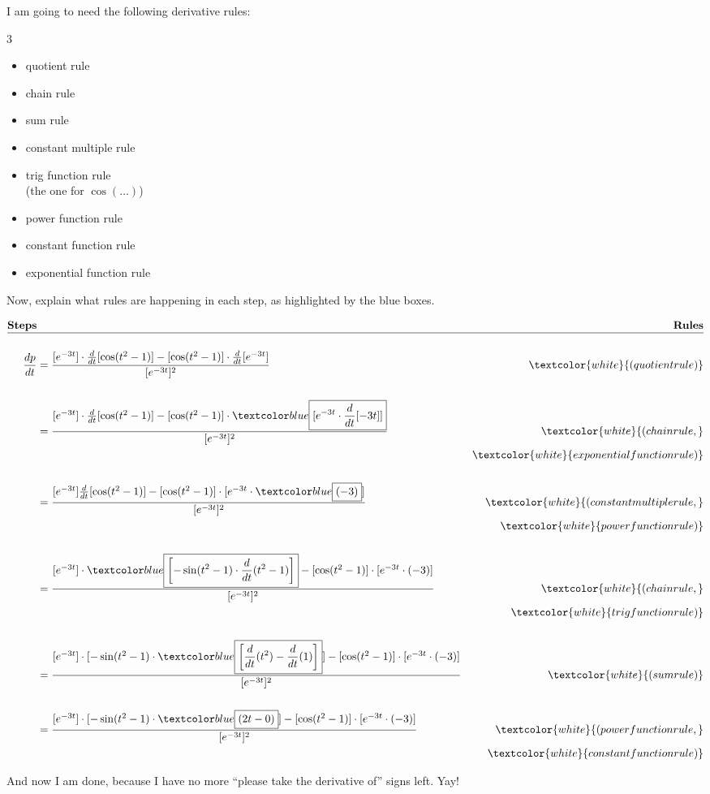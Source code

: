 I am going to need the following derivative rules:
\begin{multicols}{3}
	\begin{itemize}
		\item quotient rule
		\item chain rule
		\item sum rule
		\item constant multiple rule
		\item trig function rule \\
        (the one for $\cos(\ldots)$)
		\item power function rule
		\item constant function rule
		\item exponential function rule
	\end{itemize}
\end{multicols}
Now, explain what rules are happening in each step, as highlighted by the blue boxes. 
{\renewcommand{\textrm}{\textcolor{white}}
\begin{align*}
\textbf{Steps}& 
& \textbf{Rules} \\\hline
&&\\
\frac{dp}{dt} &= \frac{[e^{-3t}]\cdot \diff{t}[\cos(t^2-1)] - 
					   [\cos(t^2-1)]\cdot \diff{t}[e^{-3t}]}
					  {[e^{-3t}]^2}
& \textrm{(quotient rule)} \\ \\
&= \frac{[e^{-3t}] \cdot \diff{t}[\cos(t^2-1)] - 
         [\cos(t^2-1)]\cdot
         \blue{[e^{-3t}\cdot\diff{t}[-3t]]}}
		{[e^{-3t}]^2} 
& \textrm{(chain rule, } \\ 
&& \textrm{exponential function rule)} \\ \\
&= \frac{[e^{-3t}] \diff{t}[\cos(t^2-1)] - 
         [\cos(t^2-1)]\cdot 
		 [e^{-3t}\cdot\blue{(-3)}]}
		{[e^{-3t}]^2} 
& \textrm{(constant multiple rule, } \\
&& \textrm{power function rule)} \\ \\
&= \frac{[e^{-3t}] \cdot
         \blue{\left[-\sin(t^2-1)\cdot\diff{t}(t^2-1)\right]} - 
		 [\cos(t^2-1)]\cdot 
         [e^{-3t}\cdot(-3)]}
		{[e^{-3t}]^2}
& \textrm{(chain rule, } \\
&& \textrm{trig function rule)} \\ \\
&= \frac{[e^{-3t}] \cdot
         [-\sin(t^2-1)\cdot 
         \blue{\left[\diff{t}(t^2) - \diff{t}(1)\right]}] - 
		 [\cos(t^2-1)]\cdot 
         [e^{-3t}\cdot(-3)]}
		{[e^{-3t}]^2}
& \textrm{(sum rule)} \\ \\
&= \frac{[e^{-3t}] \cdot
         [-\sin(t^2-1)\cdot \blue{(2t-0)}] - 
		 [\cos(t^2-1)]\cdot 
         [e^{-3t}\cdot(-3)]}
		{[e^{-3t}]^2}
& \vspace{-2em} \textrm{(power function rule,} \\
&& \vspace{-2em} \textrm{constant function rule)}
\end{align*}

And now I am done, because I have no more ``please take the derivative of'' signs left. Yay!
}
\pagebreak

